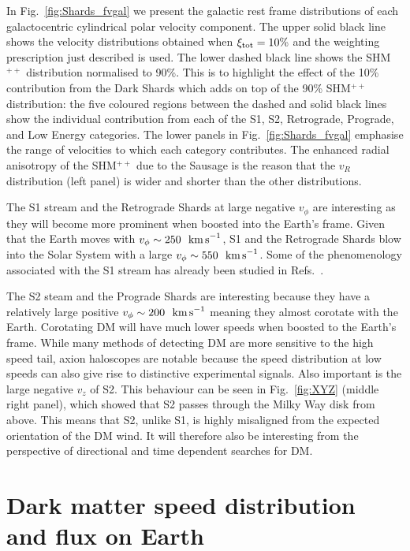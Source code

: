 \documentclass[prd,10pt,twocolumn,showpacs,nofootinbib,aps,superscriptaddress,preprintnumbers]{revtex4-1}
\newcommand{\kms}{\textrm{ km \!s}^{-1}}
\newcommand{\SHMpp}{SHM$^{++}$\xspace}
\begin{document}
  In Fig.~\ref{fig:Shards_fvgal} we present the galactic rest frame
  distributions of each galactocentric cylindrical polar velocity
  component.  The upper solid black line shows the velocity
  distributions obtained when $\xi_{\rm tot} = 10\%$ and the weighting
  prescription just described is used.  The lower dashed black line
  shows the \SHMpp distribution normalised to 90\%. This is to highlight
  the effect of the 10\% contribution from the Dark Shards which adds on
  top of the 90\% \SHMpp distribution: the five coloured regions between
  the dashed and solid black lines show the individual contribution from
  each of the S1, S2, Retrograde, Prograde, and Low Energy categories.
  The lower panels in Fig.~\ref{fig:Shards_fvgal} emphasise the range of
  velocities to which each category contributes.  The enhanced radial
  anisotropy of the \SHMpp due to the Sausage is the reason that the
  $v_R$ distribution (left panel) is wider and shorter than the other
  distributions.

The S1 stream and the Retrograde Shards at large negative $v_\phi$ are
interesting as they will become more prominent when boosted into the
Earth's frame.  Given that the Earth moves with $v_\phi \sim
250~\kms$, S1 and the Retrograde Shards blow into the Solar System
with a large $v_\phi \sim550~\kms$.  Some of the
phenomenology associated with the S1 stream has already been studied
in Refs.~\cite{OHare:2018trr,Knirck:2018knd,Buckley:2019skk}.

The S2 steam and the Prograde Shards are interesting because they have
a relatively large positive $v_\phi\sim200~\kms$ meaning they almost
corotate with the Earth. Corotating DM will have much lower speeds
when boosted to the Earth's frame.  While many methods of detecting DM
are more sensitive to the high speed tail, axion haloscopes are
notable because the speed distribution at low speeds can also give
rise to distinctive experimental signals. Also important is the large
negative $v_z$ of S2.  This behaviour can be seen in
Fig.~\ref{fig:XYZ} (middle right panel), which showed that S2 passes
through the Milky Way disk from above. This means that S2, unlike S1,
is highly misaligned from the expected orientation of the DM wind. It
will therefore also be interesting from the perspective of directional
and time dependent searches for DM.



  \section{Dark matter speed distribution and flux on Earth\label{sec:labboost}}
\end{document}
